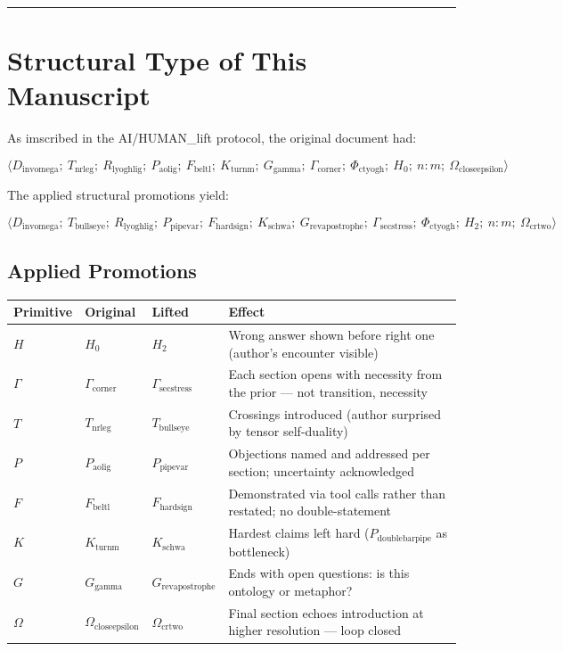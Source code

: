 \documentclass[12pt,a4paper]{article}
\begin{document}
\begin{center}
\rule{0.5\textwidth}{0.4pt}
\end{center}

\section{Structural Type of This Manuscript}

As imscribed in the AI/HUMAN\_lift protocol, the original document had:

\[\langle D_{\text{invomega}};\ T_{\text{nrleg}};\ R_{\text{lyoghlig}};\ P_{\text{aolig}};\ F_{\text{beltl}};\ K_{\text{turnm}};\ G_{\text{gamma}};\ \Gamma_{\text{corner}};\ \Phi_{\text{ctyogh}};\ H_0;\ n{:}m;\ \Omega_{\text{closeepsilon}} \rangle\]

The applied structural promotions yield:

\[\langle D_{\text{invomega}};\ T_{\text{bullseye}};\ R_{\text{lyoghlig}};\ P_{\text{pipevar}};\ F_{\text{hardsign}};\ K_{\text{schwa}};\ G_{\text{revapostrophe}};\ \Gamma_{\text{secstress}};\ \Phi_{\text{ctyogh}};\ H_2;\ n{:}m;\ \Omega_{\text{crtwo}} \rangle\]

\subsection{Applied Promotions}

\begin{table}[htbp]
\centering
\small
\begin{tabularx}{\textwidth}{>{\centering\arraybackslash}X >{\centering\arraybackslash}X >{\centering\arraybackslash}X >{\centering\arraybackslash}X}
\toprule
\rowcolor{gray!25}\textbf{Primitive} & \textbf{Original} & \textbf{Lifted} & \textbf{Effect} \\
\midrule
$H$ & $H_0$ & $H_2$ & Wrong answer shown before right one (author's encounter visible) \\
$\Gamma$ & $\Gamma_{\text{corner}}$ & $\Gamma_{\text{secstress}}$ & Each section opens with necessity from the prior --- not transition, necessity \\
$T$ & $T_{\text{nrleg}}$ & $T_{\text{bullseye}}$ & Crossings introduced (author surprised by tensor self-duality) \\
$P$ & $P_{\text{aolig}}$ & $P_{\text{pipevar}}$ & Objections named and addressed per section; uncertainty acknowledged \\
$F$ & $F_{\text{beltl}}$ & $F_{\text{hardsign}}$ & Demonstrated via tool calls rather than restated; no double-statement \\
$K$ & $K_{\text{turnm}}$ & $K_{\text{schwa}}$ & Hardest claims left hard ($P_{\text{doublebarpipe}}$ as bottleneck) \\
$G$ & $G_{\text{gamma}}$ & $G_{\text{revapostrophe}}$ & Ends with open questions: is this ontology or metaphor? \\
$\Omega$ & $\Omega_{\text{closeepsilon}}$ & $\Omega_{\text{crtwo}}$ & Final section echoes introduction at higher resolution --- loop closed \\
\bottomrule
\end{tabularx}
\end{table}
\end{document}
